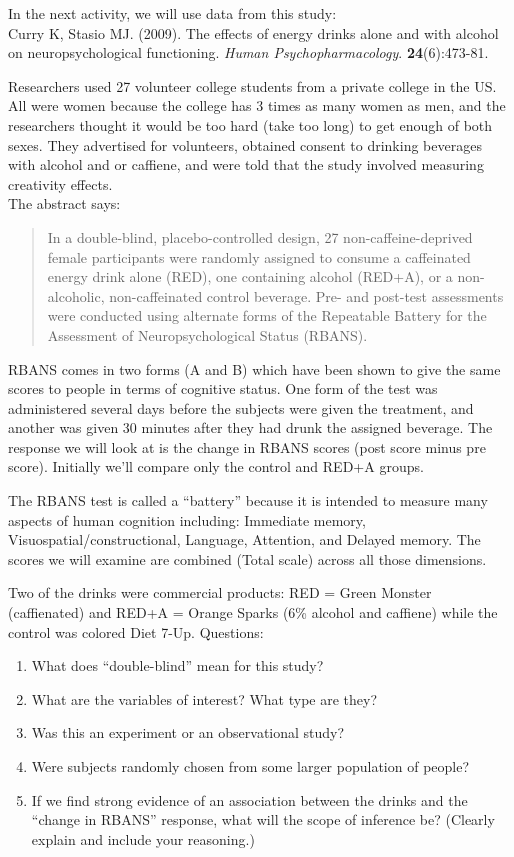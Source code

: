 \def\theTopic{Reading 12}

\large
In the next activity, we will use data  from this study:\\

 Curry K, Stasio MJ.  (2009). The effects of energy drinks alone and with
 alcohol on neuropsychological functioning. {\it Human  Psychopharmacology}.
{\bf 24}(6):473-81. 

Researchers used 27 volunteer college students from a private college
in the US. All were women because the college has 3 times as many
women as men, and the researchers thought it would be too hard (take
too long)  to get enough of both sexes. They advertised for
volunteers, obtained consent to drinking beverages with alcohol and or
caffiene, and were told that the study involved measuring creativity
effects. \\
The abstract says:

\begin{quotation}
  In a double-blind, placebo-controlled design, 27
  non-caffeine-deprived female participants were randomly assigned to
  consume a caffeinated energy drink alone (RED), one containing
  alcohol (RED+A), or a non-alcoholic, non-caffeinated control
  beverage. Pre- and post-test assessments were conducted using
  alternate forms of the Repeatable Battery for the Assessment of
  Neuropsychological Status (RBANS).
\end{quotation}

RBANS comes in two forms (A and B) which have been shown to give the
same scores to people in terms of cognitive status.  One form of the
test was administered several days before the subjects were given the
treatment, and another was given 30 minutes after they had drunk the
assigned beverage.  The response we will look at is the change in
RBANS scores (post score minus pre score). Initially we'll compare
only the control and RED+A groups.

The RBANS test is called a ``battery'' because it is intended to measure
many aspects of human cognition including: Immediate memory,
Visuospatial/constructional, Language, Attention, and  Delayed
memory. The scores we will examine are combined (Total scale) across
all those dimensions.  

Two of the drinks were commercial products: RED = Green Monster
(caffienated) and RED+A = Orange Sparks (6\% alcohol and caffiene)
while the control was colored Diet 7-Up.
\newpage
Questions:
\begin{enumerate}
\item What does ``double-blind'' mean for this study? \vfill
\item What are the variables of interest? What type are they?\vfill
\item Was this an experiment or an observational study?\vfill
\item Were subjects randomly chosen from some larger population of
  people?\vfill
\item If we find strong evidence of an association between the drinks
  and the ``change in RBANS'' response, what will the scope of
  inference be?  (Clearly explain and include your reasoning.)
\end{enumerate}
\normalsize